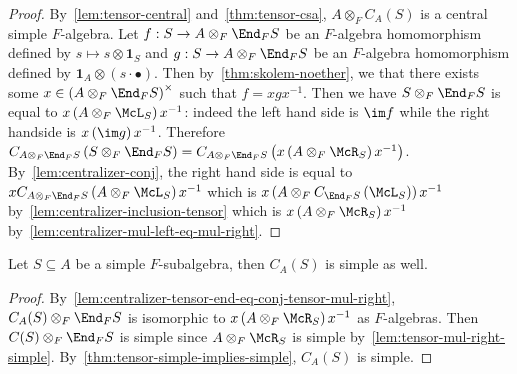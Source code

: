  \begin{proof}
   By~\cref{lem:tensor-central} and~\cref{thm:tensor-csa},
   $A \otimes_{F}C_{A}(S)$ is a central simple $F$-algebra. Let
   $f : S \to A\otimes_{F}\End_{F}S$ be an $F$-algebra homomorphism defined by
   $s \mapsto s \otimes \mathbf{1}_{S}$ and $g : S \to A \otimes_{F}\End_{F}S$
   be an $F$-algebra homomorphism defined by
   $\mathbf{1}_{A} \otimes \left(s\cdot\bullet\right)$. Then
   by~\cref{thm:skolem-noether}, we that there exists some
   $x\in \left(A\otimes_{F}\End_{F}S\right)^{\times}$ such that $f = xgx^{-1}$.
   Then we have $S\otimes_{F}\End_{F}S$ is equal to
   $x\left(A\otimes_{F}\McL_{S}\right)x^{-1}$: indeed the left hand side is
   $\im f$ while the right handside is $x\left(\im g\right)x^{-1}$. Therefore
   $C_{A\otimes_{F}\End_{F}S}\left(S\otimes_{F}\End_{F}S\right) = C_{A\otimes_{F}\End_{F}S}\left(x\left(A\otimes_{F}\McR_{S}\right)x^{-1}\right)$.
   By~\cref{lem:centralizer-conj}, the right hand side is equal to
   $xC_{A\otimes_{F}\End_{F}S}\left(A\otimes_{F}\McL_{S}\right)x^{-1}$ which is
   $x\left(A\otimes_{F}C_{\End_{F}S}\left(\McL_{S}\right)\right)x^{-1}$
   by~\cref{lem:centralizer-inclusion-tensor} which is
   $x\left(A\otimes_{F}\McR_{S}\right)x^{-1}$
   by~\cref{lem:centralizer-mul-left-eq-mul-right}.
 \end{proof}

 \begin{lemma}\label{lem:simple-centralizer}
   Let $S\subseteq A$ be a simple $F$-subalgebra, then
   $C_{A}(S)$ is simple as well.
   \leanok
 \end{lemma}

 \begin{proof}
   By~\cref{lem:centralizer-tensor-end-eq-conj-tensor-mul-right},
   $C_{A}(S) \otimes_{F}\End_{F}S$ is isomorphic to
   $x\left(A\otimes_{F}\McR_{S}\right)x^{-1}$ as $F$-algebras. Then
   $C(S)\otimes_{F}\End_{F}S$ is simple since $A\otimes_{F}\McR_{S}$ is simple
   by~\cref{lem:tensor-mul-right-simple}.
   By~\cref{thm:tensor-simple-implies-simple}, $C_{A}(S)$ is simple.
 \end{proof}

